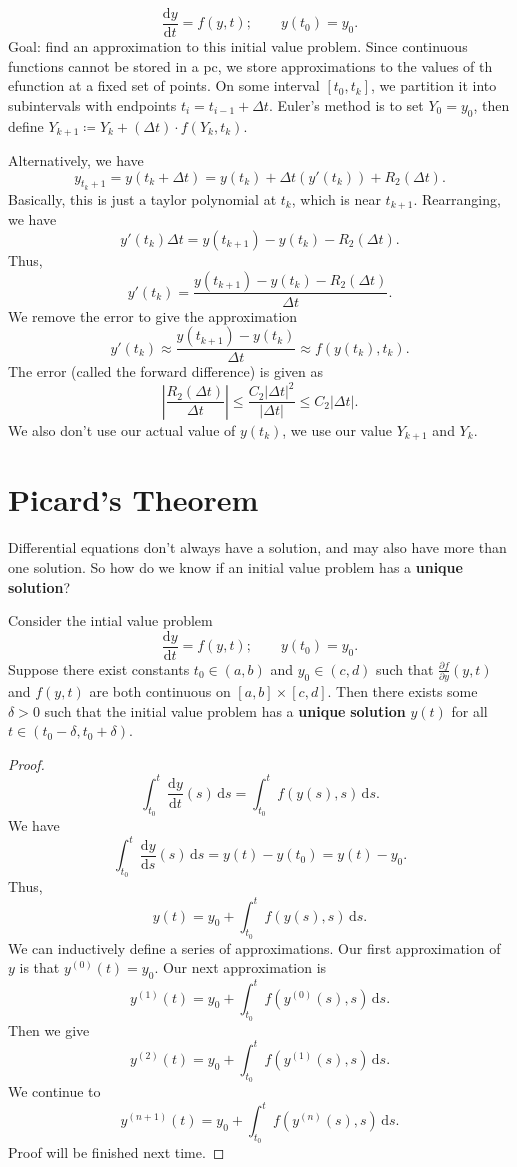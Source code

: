 
\[
	\frac{\mathrm{d}y}{\mathrm{d}t} =f(y,t);\qquad y(t_0)=y_0
.\]
Goal: find an approximation to this initial value problem. Since continuous functions cannot be stored in a pc, we store approximations to the values of th efunction at a fixed set of points. On some interval $[t_0,t_k]$, we partition it into subintervals with endpoints $t_i = t_{i-1}+\Delta t$. Euler's method is to set $Y_0 = y_0$, then define $Y_{k+1}\coloneqq Y_k+(\Delta t)\cdot f(Y_k,t_k)$.

Alternatively, we have
\[
	y_{t_k+1}=y(t_k+\Delta t)=y(t_k)+\Delta t(y'(t_k))+R_2(\Delta t)
.\]
Basically, this is just a taylor polynomial at $t_k$, which is near $t_{k+1}$. Rearranging, we have
\[
	y'(t_k)\Delta t=y(t_{k+1})-y(t_k)-R_2(\Delta t)
.\]
Thus,
\[
	y'(t_k)= \frac{y(t_{k+1})-y(t_k)-R_2(\Delta t)}{\Delta t}
.\]
We remove the error to give the approximation
\[
	y'(t_k)\approx \frac{y(t_{k+1})-y(t_k)}{\Delta t}\approx f(y(t_k),t_k)
.\]
The error (called the forward difference) is given as
\[
	\left|\frac{R_2(\Delta t)}{\Delta t}\right|\leq \frac{C_2 \left| \Delta t \right| ^2}{|\Delta t|}\leq C_2 \left| \Delta t \right| 
.\]
We also don't use our actual value of $y(t_k)$, we use our value $Y_{k+1}$ and $Y_k$.

\section{Picard's Theorem}
Differential equations don't always have a solution, and may also have more than one solution. So how do we know if an initial value problem has a \textbf{unique} \textbf{solution}?
\begin{theorem}[Picard]\label{thm:2}
	Consider the intial value problem
\[
	\frac{\mathrm{d}y}{\mathrm{d}t} =f(y,t);\qquad y(t_0)=y_0
.\]
Suppose there exist constants $t_0\in(a,b)$ and $y_0\in(c,d)$ such  that $\frac{\partial f}{\partial y} (y,t)$ and $f(y,t)$ are both continuous on $[a,b]\times [c,d]$. Then there exists some $\delta >0$ such that the initial value problem has a \textbf{unique} \textbf{solution} $y(t)$ for all $t\in(t_0-\delta ,t_0+\delta )$.
\end{theorem}
\begin{proof}
	\[
		\int_{t_0}^{t} \frac{\mathrm{d}y}{\mathrm{d}t} (s) \,\mathrm{d} s=\int_{t_0}^{t} f(y(s),s) \,\mathrm{d} s
	.\]
	We have
	\[
		\int_{t_0}^{t} \frac{\mathrm{d}y}{\mathrm{d}s} (s) \,\mathrm{d} s=y(t)-y(t_0)=y(t)-y_0
	.\]
	Thus,
	\[
		y(t)=y_0+\int_{t_0}^{t} f(y(s),s) \,\mathrm{d} s
	.\]
	We can inductively define a series of approximations. Our first approximation of $y$ is that
	$y^{(0)}(t)=y_0$. Our next approximation is
	\[
		y^{(1)}(t)=y_0+\int_{t_0}^{t} f\left( y^{(0)}(s),s \right)  \,\mathrm{d} s
	.\]
	Then we give
	\[
		y^{(2)}(t)=y_0+\int_{t_0}^{t} f\left( y^{(1)}(s),s \right)  \,\mathrm{d} s
	.\]
	We continue to
	 \[
		y^{(n+1)}(t)=y_0+\int_{t_0}^{t} f\left( y^{(n)}(s),s \right)  \,\mathrm{d} s
	.\]
	Proof will be finished next time.
\end{proof}
